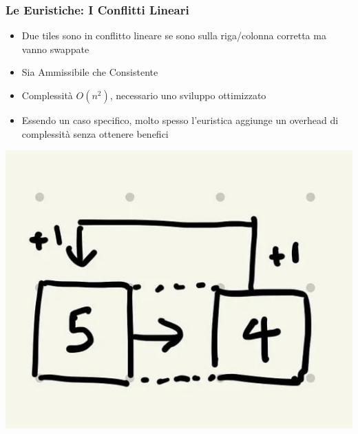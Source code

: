 \documentclass[11pt]{beamer}
\begin{document}
\begin{frame}
\frametitle{Le Euristiche: I Conflitti Lineari}
\begin{itemize}
    \item Due tiles sono in conflitto lineare se sono sulla riga/colonna corretta ma vanno swappate
    \item Sia Ammissibile che Consistente
    \item Complessità $O(n^2)$, necessario uno sviluppo ottimizzato 
    \item Essendo un caso specifico, molto spesso l'euristica aggiunge un overhead di complessità senza ottenere benefici
\end{itemize}
\includegraphics[scale=0.25]{linearconflict.jpg}
\centering
\end{frame}
\end{document}
